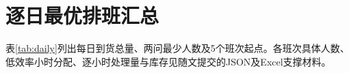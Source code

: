 \section{逐日最优排班汇总}

表\ref{tab:daily}列出每日到货总量、两问最少人数及5个班次起点。各班次具体人数、低效率小时分配、逐小时处理量与库存见随文提交的JSON及Excel支撑材料。


